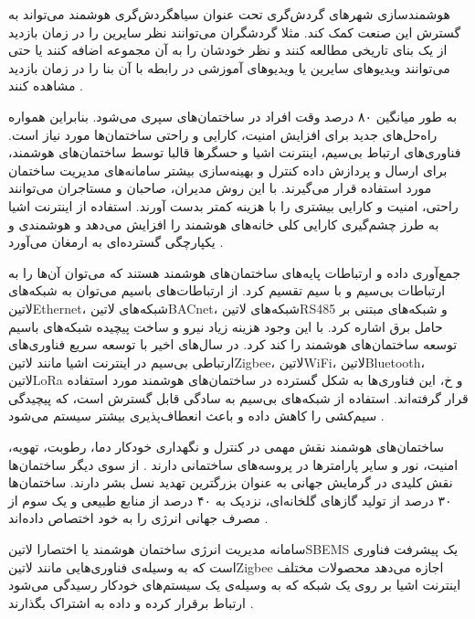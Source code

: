 هوشمند‌سازی شهرهای گردش‌گری تحت عنوان ‌سیاه{گردش‌گری هوشمند} می‌تواند به گسترش این صنعت کمک کند. مثلا گردشگران می‌توانند نظر سایرین را در زمان بازدید از یک بنای تاریخی مطالعه کنند و نظر خودشان را به آن مجموعه اضافه کنند
یا حتی می‌توانند ویدیوهای سایرین یا ویدیوهای آموزشی در رابطه با آن بنا را در زمان بازدید مشاهده کنند
.


به طور میانگین ۸۰ درصد وقت افراد در ساختمان‌های سپری می‌شود. بنابراین همواره راه‌حل‌های جدید برای افزایش
امنیت، کارایی و راحتی ساختمان‌ها مورد نیاز است.
فناوری‌های ارتباط بی‌سیم، اینترنت اشیا و حسگرها قالبا توسط ساختمان‌های هوشمند، برای
 ارسال و پردازش داده
 کنترل و بهینه‌سازی بیشتر سامانه‌های مدیریت ساختمان
مورد استفاده قرار می‌گیرند.
با این روش مدیران، صاحبان و مستاجران می‌توانند راحتی، امنیت و کارایی بیشتری را با هزینه کمتر بدست آورند.
استفاده از اینترنت اشیا به طرز چشم‌گیری کارایی کلی خانه‌های هوشمند را افزایش می‌دهد و هوشمندی و یکپارچگی
گسترده‌ای به ارمغان می‌آورد
.

جمع‌آوری داده و ارتباطات پایه‌های ساختمان‌های هوشمند هستند که می‌توان آن‌ها را به ارتباطات بی‌سیم و با سیم تقسیم کرد.
از ارتباطات‌های باسیم می‌توان به شبکه‌های ‌لاتین{Ethernet}، شبکه‌های ‌لاتین{BACnet}، شبکه‌های ‌لاتین{RS485}
و شبکه‌های مبتنی بر حامل برق اشاره کرد. با این وجود هزینه زیاد نیرو و ساخت پیچیده شبکه‌های باسیم توسعه ساختمان‌های هوشمند را
کند کرد. در سال‌های اخیر با توسعه سریع فناوری‌های ارتباطی بی‌سیم در اینترنت اشیا مانند ‌لاتین{Zigbee}، ‌لاتین{WiFi}،
‌لاتین{Bluetooth}، ‌لاتین{LoRa} و ‌خ، این فناوری‌ها به شکل گسترده در ساختمان‌های هوشمند مورد استفاده قرار گرفته‌اند.
استفاده از شبکه‌های بی‌سیم به سادگی قابل گسترش است، که پیچیدگی سیم‌کشی را کاهش داده و باعث انعطاف‌پذیری بیشتر سیستم می‌شود
.

ساختمان‌های هوشمند نقش مهمی در کنترل و نگهداری خودکار دما، رطوبت، تهویه، امنیت، نور و سایر پارامترها در پروسه‌های ساختمانی
دارند
.
از سوی دیگر ساختمان‌ها نقش کلیدی در گرمایش جهانی به عنوان بزرگترین تهدید نسل بشر دارند.
ساختمان‌ها ۳۰ درصد از تولید گازهای گلخانه‌ای، نزدیک به ۴۰ درصد از منابع طبیعی و یک سوم از مصرف جهانی
انرژی را به خود اختصاص داده‌اند
.

سامانه مدیریت انرژی ساختمان هوشمند یا اختصارا ‌لاتین{SBEMS} یک پیشرفت فناوری است
که به وسیله‌ی فناوری‌هایی مانند ‌لاتین{Zigbee} اجازه می‌دهد محصولات مختلف اینترنت اشیا
بر روی یک شبکه که به وسیله‌ی یک سیستم‌های خودکار رسیدگی می‌شود ارتباط برقرار کرده و داده به اشتراک بگذارند
.

